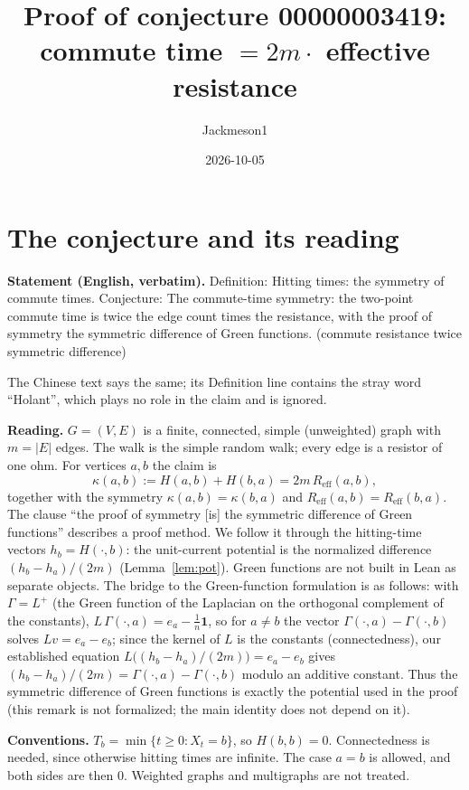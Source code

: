 \documentclass[11pt]{article}
\title{Proof of conjecture 00000003419:\\ commute time $=2m\cdot$ effective resistance}
\author{Jackmeson1}
\date{2026-10-05}
\theoremstyle{definition}
\newcommand{\Reff}{R_{\mathrm{eff}}}
\begin{document}
\maketitle

\section{The conjecture and its reading}

\textbf{Statement (English, verbatim).} Definition: Hitting times: the symmetry of commute times.
Conjecture: The commute-time symmetry: the two-point commute time is twice the edge count times the
resistance, with the proof of symmetry the symmetric difference of Green functions. (commute
resistance twice symmetric difference)

The Chinese text says the same; its Definition line contains the stray word ``Holant'', which plays
no role in the claim and is ignored.

\textbf{Reading.} $G=(V,E)$ is a finite, connected, simple (unweighted) graph with $m=|E|$ edges.
The walk is the simple random walk; every edge is a resistor of one ohm. For vertices $a,b$ the
claim is
\[ \kappa(a,b) := H(a,b)+H(b,a) = 2m\,\Reff(a,b), \]
together with the symmetry $\kappa(a,b)=\kappa(b,a)$ and $\Reff(a,b)=\Reff(b,a)$. The clause ``the
proof of symmetry [is] the symmetric difference of Green functions'' describes a proof method. We
follow it through the hitting-time vectors $h_b=H(\cdot,b)$: the unit-current potential is the
normalized difference $(h_b-h_a)/(2m)$ (Lemma~\ref{lem:pot}). Green functions are not built in Lean
as separate objects. The bridge to the Green-function formulation is as follows: with
$\Gamma=L^{+}$ (the Green function of the Laplacian on the orthogonal complement of the constants),
$L\,\Gamma(\cdot,a)=e_a-\tfrac1n\mathbf 1$, so for $a\ne b$ the vector $\Gamma(\cdot,a)-\Gamma(\cdot,b)$
solves $Lv=e_a-e_b$; since the kernel of $L$ is the constants (connectedness), our established
equation $L\big((h_b-h_a)/(2m)\big)=e_a-e_b$ gives
$(h_b-h_a)/(2m)=\Gamma(\cdot,a)-\Gamma(\cdot,b)$ modulo an additive constant. Thus the symmetric
difference of Green functions is exactly the potential used in the proof (this remark is not
formalized; the main identity does not depend on it).

\textbf{Conventions.} $T_b=\min\{t\ge 0: X_t=b\}$, so $H(b,b)=0$. Connectedness is needed, since
otherwise hitting times are infinite. The case $a=b$ is allowed, and both sides are then $0$.
Weighted graphs and multigraphs are not treated.
\end{document}

